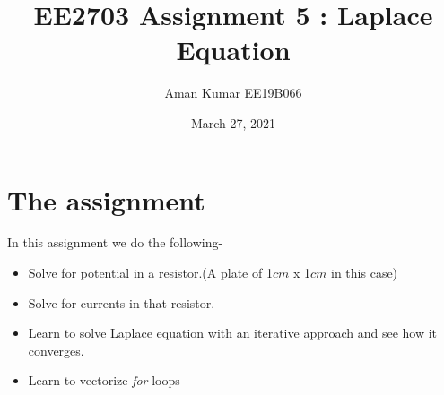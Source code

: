 \documentclass[11pt, a4paper]{article}
\title{EE2703 Assignment 5 : Laplace Equation}
\author{Aman Kumar EE19B066}
\date{March 27, 2021}
\begin{document}
\maketitle

\section{The assignment}
In this assignment we do the following-
\begin{itemize}
    \item Solve for potential in a resistor.(A plate of 1$cm$ x 1$cm$ in this case)
    \item Solve for currents in that resistor.
    \item Learn to solve Laplace equation with an iterative approach and see how it converges.
    \item Learn to vectorize \textit{for} loops
\end{itemize}
\end{document}
